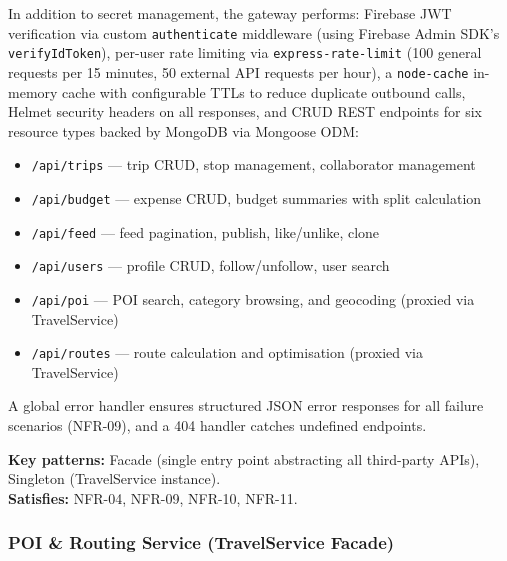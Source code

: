 \documentclass[12pt, a4paper]{article}
\begin{document}
In addition to secret management, the gateway performs: Firebase JWT verification via custom \texttt{authenticate} middleware (using Firebase Admin SDK's \texttt{verifyIdToken}), per-user rate limiting via \texttt{express-rate-limit} (100 general requests per 15 minutes, 50 external API requests per hour), a \texttt{node-cache} in-memory cache with configurable TTLs to reduce duplicate outbound calls, Helmet security headers on all responses, and CRUD REST endpoints for six resource types backed by MongoDB via Mongoose ODM:

\begin{itemize}
  \item \texttt{/api/trips} --- trip CRUD, stop management, collaborator management
  \item \texttt{/api/budget} --- expense CRUD, budget summaries with split calculation
  \item \texttt{/api/feed} --- feed pagination, publish, like/unlike, clone
  \item \texttt{/api/users} --- profile CRUD, follow/unfollow, user search
  \item \texttt{/api/poi} --- POI search, category browsing, and geocoding (proxied via TravelService)
  \item \texttt{/api/routes} --- route calculation and optimisation (proxied via TravelService)
\end{itemize}

A global error handler ensures structured JSON error responses for all failure scenarios (NFR-09), and a 404 handler catches undefined endpoints.

\begin{tcolorbox}[notebox]
  \textbf{Key patterns:} Facade (single entry point abstracting all third-party APIs), Singleton (TravelService instance).\\[2pt]
  \textbf{Satisfies:} NFR-04, NFR-09, NFR-10, NFR-11.
\end{tcolorbox}

\subsubsection{POI \& Routing Service (TravelService Facade)}
\end{document}
